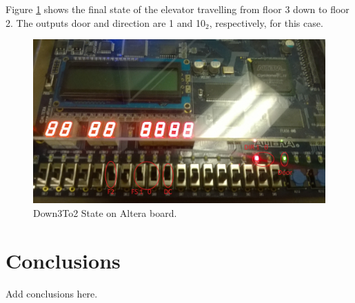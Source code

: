 \documentclass[journal]{IEEEtran}
\begin{document}
Figure \ref{down3to2} shows the final state of the elevator travelling from floor 3 down to floor 2. The outputs door and direction are 1 and 10$_{2}$, respectively, for this case.

\begin{figure}[h]
\centering
\includegraphics[width=0.9\linewidth]{Down3To2.jpg}
\caption{Down3To2 State on Altera board.}
\label{down3to2}
\end{figure}

\section{Conclusions}
Add conclusions here.





%
\end{document}
